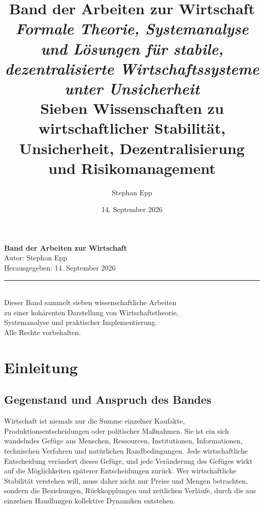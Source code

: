 \documentclass[a4paper, 12pt, twoside, openright]{report}
\title{
  \vspace*{2cm}
  {\Huge\bfseries Band der Arbeiten zur Wirtschaft}\\
  \vspace{1.5cm}
  {\Large\itshape Formale Theorie, Systemanalyse und Lösungen
für stabile, dezentralisierte Wirtschaftssysteme unter Unsicherheit}\\
  \vspace{2cm}
  {\large Sieben Wissenschaften zu wirtschaftlicher Stabilität,\\
  Unsicherheit, Dezentralisierung und Risikomanagement}
}
\author{
  \vspace{2cm}
  {\Large Stephan Epp}\\
}
\date{
  \vspace{1cm}
  {\large 14. September 2026}
}
\theoremstyle{definition}
\theoremstyle{definition}
\begin{document}
\maketitle

\thispagestyle{empty}
\cleardoublepage

\thispagestyle{empty}
\mbox{}
\vfill
\begin{center}
  \small
  \textbf{Band der Arbeiten zur Wirtschaft}\\
  \medskip
  Autor: Stephan Epp\\
  Herausgegeben: 14. September 2026\\
  \medskip
  \rule{0.3\textwidth}{0.5pt}\\
  \medskip
  Dieser Band sammelt sieben wissenschaftliche Arbeiten\\
  zu einer kohärenten Darstellung von Wirtschaftstheorie,\\
  Systemanalyse und praktischer Implementierung.\\
  \vspace{1cm}
  Alle Rechte vorbehalten.
\end{center}
\cleardoublepage

\tableofcontents
\cleardoublepage

\listoffigures
\cleardoublepage

\listoftables
\cleardoublepage


\chapter{Einleitung}
\label{ch:introduction}

\section{Gegenstand und Anspruch des Bandes}

Wirtschaft ist niemals nur die Summe einzelner Kaufakte, Produktionsentscheidungen
oder politischer Maßnahmen. Sie ist ein sich wandelndes Gefüge aus Menschen,
Ressourcen, Institutionen, Informationen, technischen Verfahren und natürlichen
Randbedingungen. Jede wirtschaftliche Entscheidung verändert dieses Gefüge, und
jede Veränderung des Gefüges wirkt auf die Möglichkeiten späterer Entscheidungen
zurück. Wer wirtschaftliche Stabilität verstehen will, muss daher nicht nur Preise
und Mengen betrachten, sondern die Beziehungen, Rückkopplungen und zeitlichen
Verläufe, durch die aus einzelnen Handlungen kollektive Dynamiken entstehen.
\end{document}
